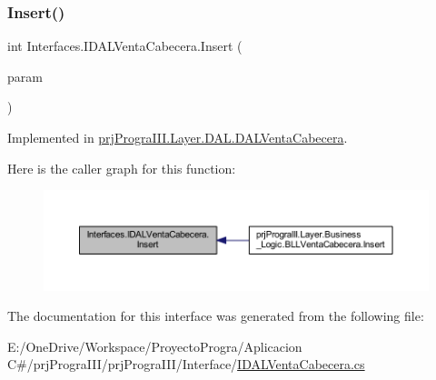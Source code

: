 \subsubsection{\texorpdfstring{Insert()}{Insert()}}
{\footnotesize\ttfamily int Interfaces.\+I\+D\+A\+L\+Venta\+Cabecera.\+Insert (\begin{DoxyParamCaption}\item[{\hyperlink{classprj_progra_i_i_i_1_1_layer_1_1_entities_1_1_venta_cabecera}{Venta\+Cabecera}}]{param }\end{DoxyParamCaption})}



Implemented in \hyperlink{classprj_progra_i_i_i_1_1_layer_1_1_d_a_l_1_1_d_a_l_venta_cabecera_a2eecc7b4375e75276b9547217d9727cf}{prj\+Progra\+I\+I\+I.\+Layer.\+D\+A\+L.\+D\+A\+L\+Venta\+Cabecera}.

Here is the caller graph for this function\+:
\nopagebreak
\begin{figure}[H]
\begin{center}
\leavevmode
\includegraphics[width=350pt]{interface_interfaces_1_1_i_d_a_l_venta_cabecera_a7da4b1733d4a28cbfe906d018d344355_icgraph}
\end{center}
\end{figure}


The documentation for this interface was generated from the following file\+:\begin{DoxyCompactItemize}
\item 
E\+:/\+One\+Drive/\+Workspace/\+Proyecto\+Progra/\+Aplicacion C\#/prj\+Progra\+I\+I\+I/prj\+Progra\+I\+I\+I/\+Interface/\hyperlink{_i_d_a_l_venta_cabecera_8cs}{I\+D\+A\+L\+Venta\+Cabecera.\+cs}\end{DoxyCompactItemize}
